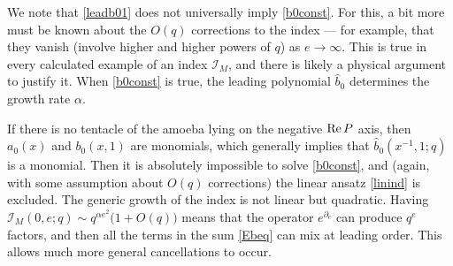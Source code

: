 \documentclass[11pt,letterpaper]{article}
\numberwithin{equation}{section}
\renewcommand{\Re}{{\rm Re}}
\newcommand{\pd}{\partial}
\newcommand{\CI}{\mathcal{I}}
\begin{document}
We note that \eqref{leadb01} does not universally imply \eqref{b0const}. For this, a bit more must be known about the $O(q)$ corrections to the index --- for example, that they vanish (involve higher and higher powers of $q$) as $e\to \infty$. This is true in every calculated example of an index $\CI_M$, and there is likely a physical argument to justify it. When \eqref{b0const} is true, the leading polynomial $\hat b_0$ determines the growth rate $\alpha$.

If there is no tentacle of the amoeba lying on the negative $\Re\,P$ axis, then $a_0(x)$ and $b_0(x,1)$ are monomials, which generally implies that $\hat b_0(x^{-1},1;q)$ is a monomial. Then it is absolutely impossible to solve \eqref{b0const}, and (again, with some assumption about $O(q)$ corrections) the linear ansatz \eqref{linind} is excluded. The generic growth of the index is not linear but quadratic. Having $\CI_M(0,e;q)\sim q^{\alpha e^2}\big(1+O(q)\big)$ means that the operator $e^{\pd_e}$ can produce $q^e$ factors, and then all the terms in the sum \eqref{Ebeq} can mix at leading order. This allows much more general cancellations to occur.













\end{document}
